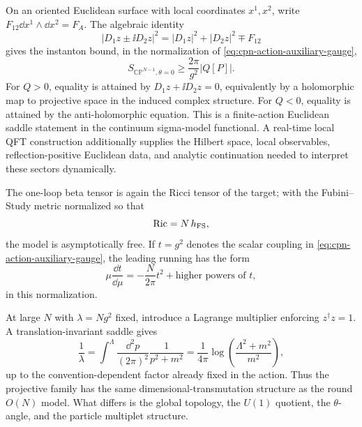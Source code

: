 On an oriented Euclidean surface with local coordinates \(x^1,x^2\), write
\(F_{12}\dd x^1\wedge\dd x^2=F_A\).  The algebraic identity
\[
  \bigl|D_1z\pm\ii D_2z\bigr|^2
  =
  |D_1z|^2+|D_2z|^2\mp F_{12}
\]
gives the instanton bound, in the normalization of
\eqref{eq:cpn-action-auxiliary-gauge},
\begin{equation}
  S_{\mathbb{CP}^{N-1},\theta=0}
  \ge
  \frac{2\pi}{g^2}|Q[P]|.
  \label{eq:cpn-instanton-bound}
\end{equation}
For \(Q>0\), equality is attained by \(D_1z+\ii D_2z=0\), equivalently by a
holomorphic map to projective space in the induced complex structure.  For
\(Q<0\), equality is attained by the anti-holomorphic equation.  This is a
finite-action Euclidean saddle statement in the continuum sigma-model
functional.  A real-time local QFT construction additionally supplies the
Hilbert space, local observables, reflection-positive Euclidean data, and
analytic continuation needed to interpret these sectors dynamically.

The one-loop beta tensor is again the Ricci tensor of the target; with the
Fubini--Study metric normalized so that
\[
  \operatorname{Ric}=N\,h_{\rm FS},
\]
the model is asymptotically free.  If \(t=g^2\) denotes the scalar coupling in
\eqref{eq:cpn-action-auxiliary-gauge}, the leading running has the form
\begin{equation}
  \mu\frac{\dd t}{\dd\mu}
  =
  -\frac{N}{2\pi}t^2+\text{higher powers of }t,
  \label{eq:cpn-leading-beta}
\end{equation}
in this normalization.

At large \(N\) with \(\lambda=Ng^2\) fixed, introduce a Lagrange multiplier
enforcing \(z^\dagger z=1\).  A translation-invariant saddle gives
\begin{equation}
  \frac1{\lambda}
  =
  \int^\Lambda\frac{\dd^2p}{(2\pi)^2}\frac1{p^2+m^2}
  =
  \frac1{4\pi}\log\!\left(\frac{\Lambda^2+m^2}{m^2}\right),
  \label{eq:cpn-large-n-gap}
\end{equation}
up to the convention-dependent factor already fixed in the action.  Thus the
projective family has the same dimensional-transmutation structure as the
round \(O(N)\) model.  What differs is the global topology, the \(U(1)\)
quotient, the \(\theta\)-angle, and the particle multiplet structure.

